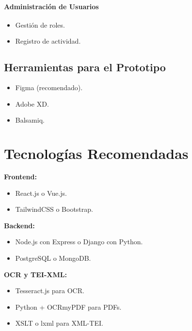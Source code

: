 \documentclass{article}
\begin{document}
\paragraph{Administración de Usuarios}
\begin{itemize}
    \item Gestión de roles.
    \item Registro de actividad.
\end{itemize}

\subsection{Herramientas para el Prototipo}
\begin{itemize}
    \item Figma (recomendado).
    \item Adobe XD.
    \item Balsamiq.
\end{itemize}

\section{Tecnologías Recomendadas}

\textbf{Frontend:}
\begin{itemize}
    \item React.js o Vue.js.
    \item TailwindCSS o Bootstrap.
\end{itemize}

\textbf{Backend:}
\begin{itemize}
    \item Node.js con Express o Django con Python.
    \item PostgreSQL o MongoDB.
\end{itemize}

\textbf{OCR y TEI-XML:}
\begin{itemize}
    \item Tesseract.js para OCR.
    \item Python + OCRmyPDF para PDFs.
    \item XSLT o lxml para XML-TEI.
\end{itemize}
\end{document}
